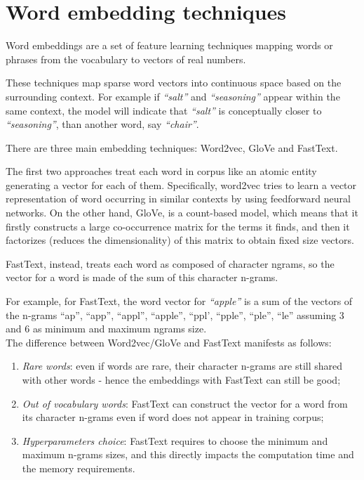 \section{Word embedding techniques}
Word embeddings are a set of feature learning techniques mapping words or phrases from the vocabulary to vectors of real numbers. \par
These techniques map sparse word vectors into continuous space based on the surrounding context. For example if \textit{``salt''} and \textit{``seasoning''} appear within the same context, the model will indicate that \textit{``salt''} is conceptually closer to \textit{``seasoning''}, than another word, say \textit{``chair''}.\par
There are three main embedding techniques: Word2vec\cite{word2vec}, GloVe\cite{glove} and FastText\cite{fasttext}. 

The first two approaches treat each word in corpus like an atomic entity generating a vector for each of them. Specifically, word2vec tries to learn a vector representation of word occurring in similar contexts by using feedforward neural networks. On the other hand, GloVe, is a count-based model, which means that it firstly constructs a large co-occurrence matrix for the terms it finds, and then it factorizes (reduces the dimensionality) of this matrix to obtain fixed size vectors.

FastText, instead, treats each word as composed of character ngrams, so the vector for a word is made of the sum of this character n-grams\cite{fasttext}. \par
For example, for FastText,  the word vector for \textit{``apple''} is a sum of the vectors of the n-grams ``ap'', ``app'', ``appl'', ``apple'', ``ppl', ``pple'', ``ple'', ``le'' assuming 3 and 6 as minimum and maximum ngrams size.\\
The difference between Word2vec/GloVe and FastText manifests as follows:
\begin{enumerate}
\item \textit{Rare words}: even if words are rare, their character n-grams are still shared with other words - hence the embeddings with FastText can still be good;
\item \textit{Out of vocabulary words}: FastText can construct the vector for a word from its character n-grams even if word does not appear in training corpus;
\item \textit{Hyperparameters choice}: FastText requires to  choose the minimum and maximum n-grams sizes, and this directly impacts the computation time and the memory requirements. 
\end{enumerate}

